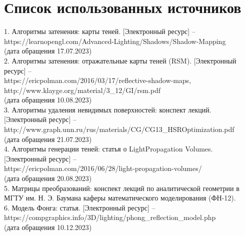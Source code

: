 \chapter*{Список использованных источников}

\hspace{-1.25cm}
1. Алгоритмы затенения: карты теней.
[Электронный ресурс] -- \\
{https://learnopengl.com/Advanced-Lighting/Shadows/Shadow-Mapping} \\
(дата обращения 17.07.2023) \\

\hspace{-1.25cm}
2. Алгоритмы затенения: отражательные карты теней (RSM).
[Электронный ресурс] -- \\
{https://ericpolman.com/2016/03/17/reflective-shadow-maps}, \\
{http://www.klayge.org/material/3\_12/GI/rsm.pdf} \\
(дата обращения 10.08.2023) \\

\hspace{-1.25cm}
3. Алгоритмы удаления невидимых поверхностей: конспект лекций.
[Электронный ресурс] -- \\
{http://www.graph.unn.ru/rus/materials/CG/CG13\_HSROptimization.pdf} \\
(дата обращения 21.07.2023) \\

\hspace{-1.25cm}
4. Алгоритмы генерации теней: статья о LightPropagation Volumes.
[Электронный ресурс] -- \\
{https://ericpolman.com/2016/06/28/light-propagation-volumes/} \\
(дата обращения 20.08.2023) \\

\hspace{-1.25cm}
5. Матрицы преобразований: конспект лекций по аналитической геометрии в
МГТУ им. Н. Э. Баумана каферы математического моделирования (ФН-12). \\

\hspace{-1.25cm}
6. Модель Фонга: статья. [Электронный ресурс] -- \\
{https://compgraphics.info/3D/lighting/phong\_reflection\_model.php} \\
(дата обращения 10.12.2023) \\

